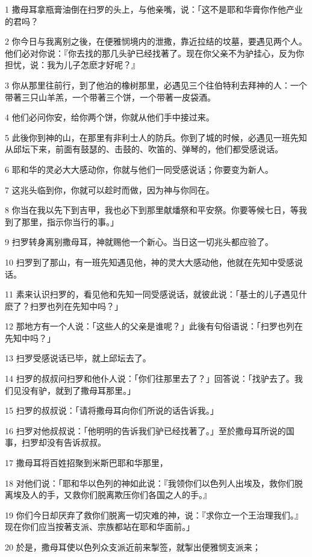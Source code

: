 \par 1 撒母耳拿瓶膏油倒在扫罗的头上，与他亲嘴，说：「这不是耶和华膏你作他产业的君吗？
\par 2 你今日与我离别之後，在便雅悯境内的泄撒，靠近拉结的坟墓，要遇见两个人。他们必对你说：『你去找的那几头驴已经找著了。现在你父亲不为驴挂心，反为你担忧，说：我为儿子怎麽才好呢？』
\par 3 你从那里往前行，到了他泊的橡树那里，必遇见三个往伯特利去拜神的人：一个带著三只山羊羔，一个带著三个饼，一个带著一皮袋酒。
\par 4 他们必问你安，给你两个饼，你就从他们手中接过来。
\par 5 此後你到神的山，在那里有非利士人的防兵。你到了城的时候，必遇见一班先知从邱坛下来，前面有鼓瑟的、击鼓的、吹笛的、弹琴的，他们都受感说话。
\par 6 耶和华的灵必大大感动你，你就与他们一同受感说话；你要变为新人。
\par 7 这兆头临到你，你就可以趁时而做，因为神与你同在。
\par 8 你当在我以先下到吉甲，我也必下到那里献燔祭和平安祭。你要等候七日，等我到了那里，指示你当行的事。」
\par 9 扫罗转身离别撒母耳，神就赐他一个新心。当日这一切兆头都应验了。
\par 10 扫罗到了那山，有一班先知遇见他，神的灵大大感动他，他就在先知中受感说话。
\par 11 素来认识扫罗的，看见他和先知一同受感说话，就彼此说：「基士的儿子遇见什麽了？扫罗也列在先知中吗？」
\par 12 那地方有一个人说：「这些人的父亲是谁呢？」此後有句俗语说：「扫罗也列在先知中吗？」
\par 13 扫罗受感说话已毕，就上邱坛去了。
\par 14 扫罗的叔叔问扫罗和他仆人说：「你们往那里去了？」回答说：「找驴去了。我们见没有驴，就到了撒母耳那里。」
\par 15 扫罗的叔叔说：「请将撒母耳向你们所说的话告诉我。」
\par 16 扫罗对他叔叔说：「他明明的告诉我们驴已经找著了。」至於撒母耳所说的国事，扫罗却没有告诉叔叔。
\par 17 撒母耳将百姓招聚到米斯巴耶和华那里，
\par 18 对他们说：「耶和华以色列的神如此说：『我领你们以色列人出埃及，救你们脱离埃及人的手，又救你们脱离欺压你们各国之人的手。』
\par 19 你们今日却厌弃了救你们脱离一切灾难的神，说：『求你立一个王治理我们。』现在你们应当按著支派、宗族都站在耶和华面前。」
\par 20 於是，撒母耳使以色列众支派近前来掣签，就掣出便雅悯支派来；
